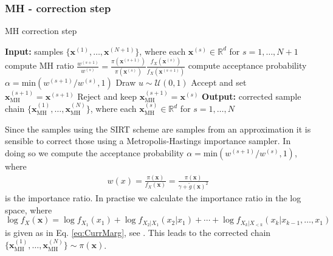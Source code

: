 \subsubsection{MH - correction step}
\begin{algorithm}[!ht]
	\caption{MH correction step}
	\begin{algorithmic}[1]
		\STATE \textbf{Input:} samples $\{ \bm{x}^{(1)},\dots, \bm{x}^{(N+1)} \} $, where each $\bm{x}^{(s)} \in \mathbb{R}^d$ for $s = 1, \dots, N+1$
		\STATE compute MH ratio $\frac{w^{(s+1)}}{w^{(s)} } =\frac{\pi(\bm{x}^{(s+1)})}{\pi(\bm{x}^{(s)})} \frac{f_X(\bm{x}^{(s)})}{f_X(\bm{x}^{(s+1)})}$ 
		\STATE compute acceptance probability $\alpha = \text{min}(w^{(s+1)}/w^{(s)}, 1)$ 
		\STATE Draw $u \sim \mathcal{U}(0,1)$
		\STATE Accept and set $\bm{x}_{\text{MH}}^{(s+1)} = \bm{x}^{(s+1)}$
		\ELSE  
		\STATE Reject and keep $\bm{x}_{\text{MH}}^{(s+1)} = \bm{x}^{(s)}$
		\ENDIF
		\ENDFOR
		\STATE \textbf{Output:} corrected sample chain $\{ \bm{x}_{\text{MH}}^{(1)},\dots, \bm{x}_{\text{MH}}^{(N)} \} $, where each $\bm{x}_{\text{MH}}^{(s)} \in \mathbb{R}^d$ for $s = 1, \dots, N$
	\end{algorithmic}
	\label{alg:SIRT}
\end{algorithm}
Since the samples using the SIRT scheme are samples from an approximation it is sensible to correct those using a Metropolis-Hastings importance sampler.
In doing so we compute the acceptance probability $  \alpha = \text{min}(w^{(s+1)}/w^{(s)}, 1)$, where 
\begin{align}
	w(x) = \frac{\pi(\bm{x})}{f_X(\bm{x})} = \frac{\pi(\bm{x})}{\gamma + \tilde{g}(\bm{x})^2} 
\end{align}
is the importance ratio.
In practise we calculate the importance ratio in the log space, where $\log f_X(\bm{x})  =  \log f_{X_1}(x_1) + \log f_{X_2|X_1}(x_2|x_1) + \cdots + \log f_{X_k|X_{<k}}(x_k|x_{k-1},\dots,x_1)$ is given as in Eq. \ref{eq:CurrMarg}, see \cite{dolgov2020approximation}.
This leads to the corrected chain $ \{ \bm{x}_{\text{MH}}^{(1)},\dots, \bm{x}_{\text{MH}}^{(N)}  \} \sim \pi(\bm{x}) $.


